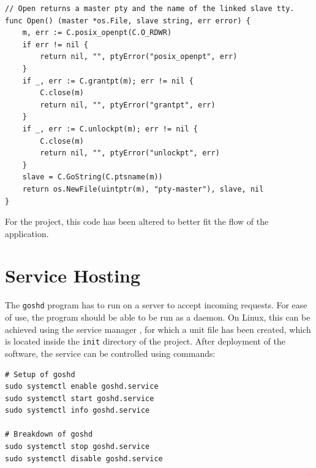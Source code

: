 \documentclass[10pt,a4paper,titlepage,twoside,english,final]{zhawreprt}
\begin{document}
\setlistingGo
\begin{lstlisting}[caption={\gls{Go}'s \gls{pty} wrapper},label=lst:GoPty]
// Open returns a master pty and the name of the linked slave tty.
func Open() (master *os.File, slave string, err error) {
	m, err := C.posix_openpt(C.O_RDWR)
	if err != nil {
		return nil, "", ptyError("posix_openpt", err)
	}
	if _, err := C.grantpt(m); err != nil {
		C.close(m)
		return nil, "", ptyError("grantpt", err)
	}
	if _, err := C.unlockpt(m); err != nil {
		C.close(m)
		return nil, "", ptyError("unlockpt", err)
	}
	slave = C.GoString(C.ptsname(m))
	return os.NewFile(uintptr(m), "pty-master"), slave, nil
}
\end{lstlisting}
For the project, this code has been altered to better fit the flow of the application.


\section{Service Hosting}\label{sec:ImplServiceHosting}
The \texttt{goshd} program has to run on a server to accept incoming requests.
For ease of use, the program should be able to be run as a \gls{daemon}.
On \gls{Linux}, this can be achieved using the service manager \cite{systemd}, for which a unit file has been created, which is located inside the \texttt{init} directory of the project.
After deployment of the software, the service can be controlled using \cite{systemd} commands:
\setlistingBash
\begin{lstlisting}[caption={\texttt{goshd} service control},label=lst:GoshdServiceCtl,deletekeywords={enable}]
# Setup of goshd
sudo systemctl enable goshd.service
sudo systemctl start goshd.service
sudo systemctl info goshd.service

# Breakdown of goshd
sudo systemctl stop goshd.service
sudo systemctl disable goshd.service
\end{lstlisting}
\end{document}
